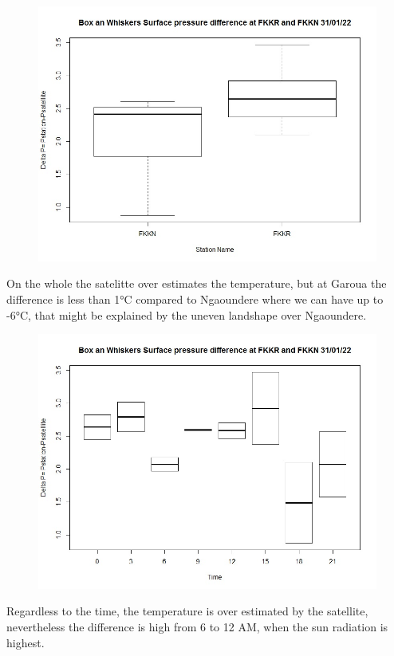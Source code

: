 \begin{figure}[H]
\begin{center}
\includegraphics[scale=0.6]{boxplotFKKNFKKRDeltaP.jpg} %
\end{center}
\end{figure}
On the whole the satelitte over estimates the temperature, but at Garoua  the difference is less than 1°C  compared to Ngaoundere  where we can have up to -6°C, that might be explained by the uneven landshape over Ngaoundere.


\begin{figure}[H]
\begin{center}
\includegraphics[scale=0.6]{boxplotFKKNFKKRDeltaPtime.jpg} %
\end{center}
\end{figure}
Regardless to the time, the temperature is over estimated by the satellite, nevertheless the difference is high from 6 to 12 AM, when the sun radiation is highest.

